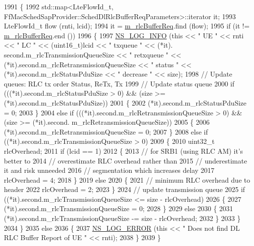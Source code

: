 \begin{DoxyCode}
1991 \{
1992   std::map<LteFlowId\_t, FfMacSchedSapProvider::SchedDlRlcBufferReqParameters>::iterator it;
1993   LteFlowId\_t flow (rnti, lcid);
1994   it = \hyperlink{classns3_1_1TdMtFfMacScheduler_a274915411679d20f822c11e4c8d61e22}{m\_rlcBufferReq}.find (flow);
1995   \textcolor{keywordflow}{if} (it != \hyperlink{classns3_1_1TdMtFfMacScheduler_a274915411679d20f822c11e4c8d61e22}{m\_rlcBufferReq}.end ())
1996     \{
1997       \hyperlink{group__logging_gafbd73ee2cf9f26b319f49086d8e860fb}{NS\_LOG\_INFO} (\textcolor{keyword}{this} << \textcolor{stringliteral}{" UE "} << rnti << \textcolor{stringliteral}{" LC "} << (uint16\_t)lcid << \textcolor{stringliteral}{" txqueue "} << (*it).
      second.m\_rlcTransmissionQueueSize << \textcolor{stringliteral}{" retxqueue "} << (*it).second.m\_rlcRetransmissionQueueSize << \textcolor{stringliteral}{" status "} 
      << (*it).second.m\_rlcStatusPduSize << \textcolor{stringliteral}{" decrease "} << size);
1998       \textcolor{comment}{// Update queues: RLC tx order Status, ReTx, Tx}
1999       \textcolor{comment}{// Update status queue}
2000       \textcolor{keywordflow}{if} (((*it).second.m\_rlcStatusPduSize > 0) && (size >= (*it).second.m\_rlcStatusPduSize))
2001         \{
2002            (*it).second.m\_rlcStatusPduSize = 0;
2003         \}
2004       \textcolor{keywordflow}{else} \textcolor{keywordflow}{if} (((*it).second.m\_rlcRetransmissionQueueSize > 0) && (size >= (*it).second.
      m\_rlcRetransmissionQueueSize))
2005         \{
2006           (*it).second.m\_rlcRetransmissionQueueSize = 0;
2007         \}
2008       \textcolor{keywordflow}{else} \textcolor{keywordflow}{if} ((*it).second.m\_rlcTransmissionQueueSize > 0)
2009         \{
2010           uint32\_t rlcOverhead;
2011           \textcolor{keywordflow}{if} (lcid == 1)
2012             \{
2013               \textcolor{comment}{// for SRB1 (using RLC AM) it's better to}
2014               \textcolor{comment}{// overestimate RLC overhead rather than}
2015               \textcolor{comment}{// underestimate it and risk unneeded}
2016               \textcolor{comment}{// segmentation which increases delay }
2017               rlcOverhead = 4;                                  
2018             \}
2019           \textcolor{keywordflow}{else}
2020             \{
2021               \textcolor{comment}{// minimum RLC overhead due to header}
2022               rlcOverhead = 2;
2023             \}
2024           \textcolor{comment}{// update transmission queue}
2025           \textcolor{keywordflow}{if} ((*it).second.m\_rlcTransmissionQueueSize <= size - rlcOverhead)
2026             \{
2027               (*it).second.m\_rlcTransmissionQueueSize = 0;
2028             \}
2029           \textcolor{keywordflow}{else}
2030             \{                    
2031               (*it).second.m\_rlcTransmissionQueueSize -= size - rlcOverhead;
2032             \}
2033         \}
2034     \}
2035   \textcolor{keywordflow}{else}
2036     \{
2037       \hyperlink{group__logging_ga0261a8db1d4ac5f79417d117634fd455}{NS\_LOG\_ERROR} (\textcolor{keyword}{this} << \textcolor{stringliteral}{" Does not find DL RLC Buffer Report of UE "} << rnti);
2038     \}
2039 \}
\end{DoxyCode}


